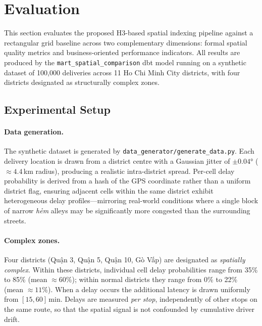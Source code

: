 \section{Evaluation}
\label{sec:evaluation}

This section evaluates the proposed H3-based spatial indexing pipeline against a
rectangular grid baseline across two complementary dimensions: formal spatial
quality metrics and business-oriented performance indicators.
All results are produced by the \texttt{mart\_spatial\_comparison} dbt model running
on a synthetic dataset of 100{,}000 deliveries across 11 Ho Chi Minh City districts,
with four districts designated as structurally complex zones.


\subsection{Experimental Setup}

\paragraph{Data generation.}
The synthetic dataset is generated by \texttt{data\_generator/generate\_data.py}.
Each delivery location is drawn from a district centre with a Gaussian jitter of
$\pm 0.04°$ (${\approx}4.4$\,km radius), producing a realistic intra-district
spread.
Per-cell delay probability is derived from a hash of the GPS coordinate rather
than a uniform district flag, ensuring adjacent cells within the same district
exhibit heterogeneous delay profiles—mirroring real-world conditions where a
single block of narrow \textit{hẻm} alleys may be significantly more congested
than the surrounding streets.

\paragraph{Complex zones.}
Four districts (Quận 3, Quận 5, Quận 10, Gò Vấp) are designated as
\emph{spatially complex}.
Within these districts, individual cell delay probabilities range from 35\% to
85\% (mean $\approx 60\%$); within normal districts they range from 0\% to 22\%
(mean $\approx 11\%$).
When a delay occurs the additional latency is drawn uniformly from
$[15, 60]$\,min.
Delays are measured \emph{per stop}, independently of other stops on the same
route, so that the spatial signal is not confounded by cumulative driver drift.


